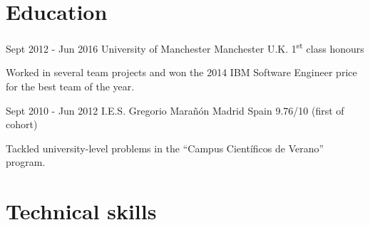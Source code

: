 \documentclass[10pt]{CurriculumVitae}
\begin{document}
  \section{Education}
   
      {Sept 2012 - Jun 2016}
      {University of Manchester}
      {Manchester}
      {U.K.}
      {1\textsuperscript{st} class honours}
      {
         \item Worked in several team projects and won the 2014 IBM Software Engineer price for the best team of the year.
      }

      {Sept 2010 - Jun 2012}
      {I.E.S. Gregorio Marañón}
      {Madrid}
      {Spain}
      {9.76/10 (first of cohort)}
      {
        \item Tackled university-level problems in the ``Campus Científicos de Verano'' program.
      }


  \section{Technical skills}
\end{document}

